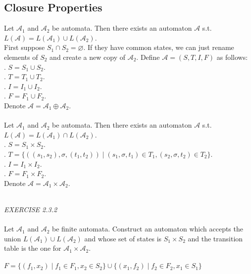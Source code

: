 \documentclass{article}
\begin{document}
\subsection{Closure Properties}
\color{red}Let \(\mathcal{A}_{1}\) and \(\mathcal{A}_{2}\) be automata. Then there exists an automaton \(\mathcal{A}\) s.t. \(L(\mathcal{A})=L(\mathcal{A}_{1})\cup L(\mathcal{A}_{2})\).\color{black}\\
First suppose \(S_{1}\cap S_{2}=\varnothing\). If they have common states, we can just rename elements of \(S_{2}\) and create a new copy of \(\mathcal{A}_{2}\). Define \(\mathcal{A}=(S,T,I,F)\) as follows:\\
\null{}. \(S=S_{1}\cup S_{2}\).\\
\null{}. \(T=T_{1}\cup T_{2}\).\\
\null{}. \(I=I_{1}\cup I_{2}\).\\
\null{}. \(F=F_{1}\cup F_{2}\).\\
Denote \(\mathcal{A}=\mathcal{A}_{1}\oplus\mathcal{A}_{2}\).\\\\
\color{red}Let \(\mathcal{A}_{1}\) and \(\mathcal{A}_{2}\) be automata. Then there exists an automaton \(\mathcal{A}\) s.t. \(L(\mathcal{A})=L(\mathcal{A}_{1})\cap L(\mathcal{A}_{2})\).\color{black}\\
\null{}. \(S=S_{1}\times S_{2}\).\\
\null{}. \(T=\{((s_{1},s_{2}),\sigma,(t_{1},t_{2}))\;|\;(s_{1},\sigma,t_{1})\in T_{1},(s_{2},\sigma,t_{2})\in T_{2}\}\).\\
\null{}. \(I=I_{1}\times I_{2}\).\\
\null{}. \(F=F_{1}\times F_{2}\).\\
Denote \(\mathcal{A}=\mathcal{A}_{1}\times\mathcal{A}_{2}\).\\\\
\begin{siderules}\color{blue}\textit{EXERCISE 2.3.2}\color{black}\\\\
\color{blue}Let \(\mathcal{A}_{1}\) and \(\mathcal{A}_{2}\) be finite automata. Construct an automaton which
accepts the union \(L(\mathcal{A}_{1})\cup L(\mathcal{A}_{2})\) and whose set of states is \(S_{1}\times S_{2}\) and the transition table is the one for \(\mathcal{A}_{1}\times\mathcal{A}_{2}\).\color{black}\\\\
\(F=\{(f_{1},x_{2})\;|\;f_{1}\in F_{1},x_{2}\in S_{2}\}\cup \{(x_{1},f_{2})\;|\;f_{2}\in F_{2},x_{1}\in S_{1}\}\)
\end{siderules}
\end{document}
